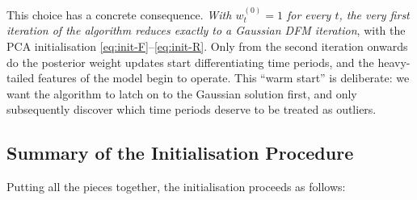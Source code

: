 \documentclass[11pt, a4paper, oneside]{article}
\begin{document}
This choice has a concrete consequence. \emph{With
$w_t^{(0)} = 1$ for every $t$, the very first iteration of the
algorithm reduces exactly to a Gaussian DFM iteration}, with the PCA
initialisation \eqref{eq:init-F}--\eqref{eq:init-R}. Only from the
second iteration onwards do the posterior weight updates start
differentiating time periods, and the heavy-tailed features of the
model begin to operate. This ``warm start'' is deliberate: we want the
algorithm to latch on to the Gaussian solution first, and only
subsequently discover which time periods deserve to be treated as
outliers.

\newpage

\subsection{Summary of the Initialisation Procedure}

Putting all the pieces together, the initialisation proceeds as follows:
\end{document}
